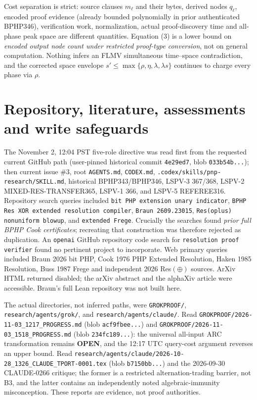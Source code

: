 \documentclass[11pt]{article}
\begin{document}
Cost separation is strict: source clauses $m_\ell$ and their bytes, derived nodes $q_\ell$, encoded proof evidence (already bounded polynomially in prior authenticated BPHP346), verification work, normalization, actual proof-discovery time and all-phase peak space are different quantities. Equation (3) is a lower bound on \emph{encoded output node count under restricted proof-type conversion}, not on general computation. Nothing infers an FLMV simultaneous time--space contradiction, and the corrected space envelope $s'\le\max\{\rho,\eta,\lambda,\lambda s\}$ continues to charge every phase via $\rho$.

\section*{Repository, literature, assessments and write safeguards}
The November 2, 12:04 PST five-role directive was read first from the requested current GitHub path (user-pinned historical commit \texttt{4e29ed7}, blob \texttt{033b54b...}); then current issue \#3, root \texttt{AGENTS.md}, \texttt{CODEX.md}, \texttt{.codex/skills/pnp-research/SKILL.md}, historical BPHP343/BPHP346, LSPV-3 367/368, LSPV-2 MIXED-RES-TRANSFER365, LSPV-1 366, and LSPV-5 REFEREE316. Repository search queries included \texttt{bit PHP extension unary indicator}, \texttt{BPHP Res XOR extended resolution compiler}, \texttt{Braun 2609.23015}, \texttt{Res(oplus) nonuniform blowup}, and \texttt{extended Frege}. Crucially the searches found \emph{prior full BPHP Cook certificates}; recreating that construction was therefore rejected as duplication. An \texttt{openai} GitHub repository code search for \texttt{resolution proof verifier} found no pertinent project to incorporate. Web primary queries included Braun 2026 bit PHP, Cook 1976 PHP Extended Resolution, Haken 1985 Resolution, Buss 1987 Frege and independent 2026 Res$(\oplus)$ sources. ArXiv HTML returned disabled; the arXiv abstract and the alphaXiv article were accessible. Braun's full Lean repository was not built here.

The actual directories, not inferred paths, were \texttt{GROKPROOF/}, \texttt{research/agents/grok/}, and \texttt{research/agents/claude/}. Read \texttt{GROKPROOF/2026-11-03\_1217\_PROGRESS.md} (blob \texttt{acf9fbee...}) and \texttt{GROKPROOF/2026-11-03\_1518\_PROGRESS.md} (blob \texttt{234fc189...}): the universal all-input ARC transformation remains \textbf{OPEN}, and the 12:17 UTC query-cost argument reverses an upper bound. Read \texttt{research/agents/claude/2026-10-28\_1326\_CLAUDE\_TPORT-0001.tex} (blob \texttt{b7150bb...}) and the 2026-09-30 CLAUDE-0266 critique; the former is a restricted alternation-trading barrier, not B3, and the latter contains an independently noted algebraic-immunity misconception. These reports are evidence, not proof authorities.
\end{document}
